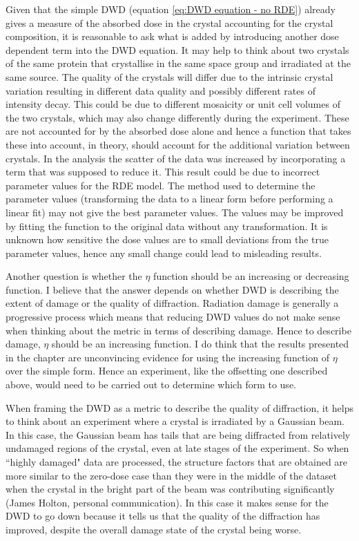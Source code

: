 Given that the simple DWD (equation \ref{eq:DWD equation - no RDE}) already gives a measure of the absorbed dose in the crystal accounting for the crystal composition, it is reasonable to ask what is added by introducing another dose dependent term into the DWD equation.
It may help to think about two crystals of the same protein that crystallise in the same space group and irradiated at the same source.
The quality of the crystals will differ due to the intrinsic crystal variation resulting in different data quality and possibly different rates of intensity decay.
This could be due to different mosaicity or unit cell volumes of the two crystals, which may also change differently during the experiment.
These are not accounted for by the absorbed dose alone and hence a function that takes these into account, in theory, should account for the additional variation between crystals.
In the analysis the scatter of the data was increased by incorporating a term that was supposed to reduce it.
This result could be due to incorrect parameter values for the RDE model.
The method used to determine the parameter values (transforming the data to a linear form before performing a linear fit) may not give the best parameter values.
The values may be improved by fitting the function to the original data without any transformation.
It is unknown how sensitive the dose values are to small deviations from the true parameter values, hence any small change could lead to misleading results.

Another question is whether the $\eta$ function should be an increasing or decreasing function.
I believe that the answer depends on whether DWD is describing the extent of damage or the quality of diffraction.
Radiation damage is generally a progressive process which means that reducing DWD values do not make sense when thinking about the metric in terms of describing damage.
Hence to describe damage, $\eta$ should be an increasing function.
I do think that the results presented in the chapter are unconvincing evidence for using the increasing function of $\eta$ over the simple form.
Hence an experiment, like the offsetting one described above, would need to be carried out to determine which form to use.

When framing the DWD as a metric to describe the quality of diffraction, it helps to think about an experiment where a crystal is irradiated by a Gaussian beam.
In this case, the Gaussian beam has tails that are being diffracted from relatively undamaged regions of the crystal, even at late stages of the experiment.
So when ``highly damaged" data are processed, the structure factors that are obtained are more similar to the zero-dose case than they were in the middle of the dataset when the crystal in the bright part of the beam was contributing significantly (James Holton, personal communication).
In this case it makes sense for the DWD to go down because it tells us that the quality of the diffraction has improved, despite the overall damage state of the crystal being worse.

